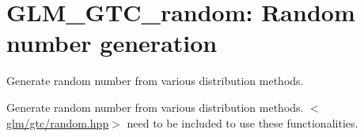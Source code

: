 \hypertarget{group__gtc__random}{\section{\-G\-L\-M\-\_\-\-G\-T\-C\-\_\-random\-: \-Random number generation}
\label{group__gtc__random}
}


\-Generate random number from various distribution methods.  


\-Generate random number from various distribution methods. $<$\hyperlink{gtc_2random_8hpp}{glm/gtc/random.\-hpp}$>$ need to be included to use these functionalities. 